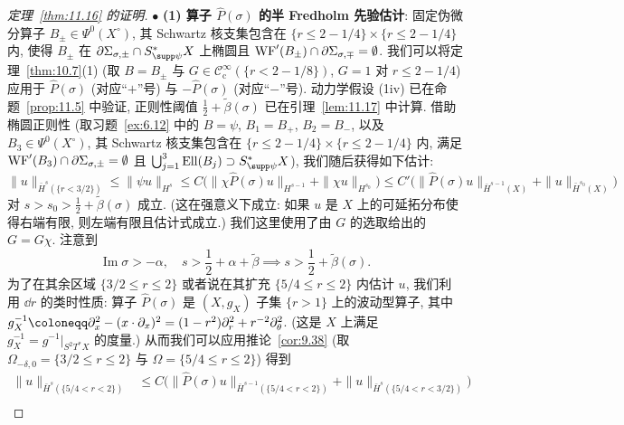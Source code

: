 \begin{proof}[定理~\ref{thm:11.16} 的证明]
\noindent $\bullet$ \textbf{(1) 算子 $\widehat{P}(\sigma)$ 的半 Fredholm 先验估计}:
固定伪微分算子 $B_\pm \in \Psi^0(X^\circ)$, 其 Schwartz 核支集包含在 $\{r \le 2 - 1/4\} \times \{r \le 2 - 1/4\}$ 内, 使得 $B_\pm$ 在 $\partial\Sigma_{\sigma, \pm} \cap S_{\supp\psi}^* X$ 上椭圆且 $\operatorname{WF}'(B_\pm) \cap \partial\Sigma_{\sigma, \mp} = \emptyset$. 我们可以将定理~\ref{thm:10.7}(1) (取 $B = B_\pm$ 与 $G \in \mathcal{C}_{\mathrm{c}}^\infty(\{r < 2 - 1/8\})$, $G = 1$ 对 $r \le 2 - 1/4$) 应用于 $\widehat{P}(\sigma)$ (对应“$+$”号) 与 $-\widehat{P}(\sigma)$ (对应“$-$”号). 动力学假设 (1iv) 已在命题~\ref{prop:11.5} 中验证, 正则性阈值 $\frac{1}{2} + \tilde\beta(\sigma)$ 已在引理~\ref{lem:11.17} 中计算. 借助椭圆正则性 (取习题~\ref{ex:6.12} 中的 $B = \psi$, $B_1 = B_+$, $B_2 = B_-$, 以及 $B_3 \in \Psi^0(X^\circ)$, 其 Schwartz 核支集包含在 $\{r \le 2 - 1/4\} \times \{r \le 2 - 1/4\}$ 内, 满足 $\operatorname{WF}'(B_3) \cap \partial\Sigma_{\sigma, \pm} = \emptyset$ 且 $\bigcup_{j=1}^3 \operatorname{Ell}(B_j) \supset S_{\supp\psi}^* X$), 我们随后获得如下估计:
\begin{equation}\label{eq:11.63}
    \|u\|_{\bar H^s(\{r < 3/2\})} \le \|\psi u\|_{H^s} \le C \big( \|\chi \widehat{P}(\sigma)u\|_{H^{s-1}} + \|\chi u\|_{H^{s_0}} \big) \le C' \big( \|\widehat{P}(\sigma)u\|_{\bar H^{s-1}(X)} + \|u\|_{\bar H^{s_0}(X)} \big)
\end{equation}
对 $s > s_0 > \frac{1}{2} + \tilde\beta(\sigma)$ 成立. (这在强意义下成立: 如果 $u$ 是 $X$ 上的可延拓分布使得右端有限, 则左端有限且估计式成立.) 我们这里使用了由 $G$ 的选取给出的 $G = G\chi$. 注意到
\begin{equation}\label{eq:11.64}
    \operatorname{Im}\sigma > -\alpha, \quad s > \frac{1}{2} + \alpha + \tilde\beta \implies s > \frac{1}{2} + \tilde\beta(\sigma).
\end{equation}
为了在其余区域 $\{3/2 \le r \le 2\}$ 或者说在其扩充 $\{5/4 \le r \le 2\}$ 内估计 $u$, 我们利用 $\dd r$ 的类时性质: 算子 $\widehat{P}(\sigma)$ 是 $(X, g_X)$ 子集 $\{r > 1\}$ 上的波动型算子, 其中 $g_X^{-1} \defeq \partial_x^2 - (x \cdot \partial_x)^2 = (1 - r^2)\partial_r^2 + r^{-2}\partial_\theta^2$. (这是 $X$ 上满足 $g_X^{-1} = g^{-1}|_{S^2 T^* X}$ 的度量.) 从而我们可以应用推论~\ref{cor:9.38} (取 $\Omega_{-\delta, 0} = \{3/2 \le r \le 2\}$ 与 $\Omega = \{5/4 \le r \le 2\}$) 得到
\begin{equation}\label{eq:11.65}
\begin{aligned}
    \|u\|_{\bar H^s(\{5/4 < r < 2\})}
    &\le C \big( \|\widehat{P}(\sigma) u\|_{\bar H^{s-1}(\{5/4 < r < 2\})} + \|u\|_{\bar H^s(\{5/4 < r < 3/2\})} \big) \\

\end{aligned}
\end{equation}
\end{proof}
